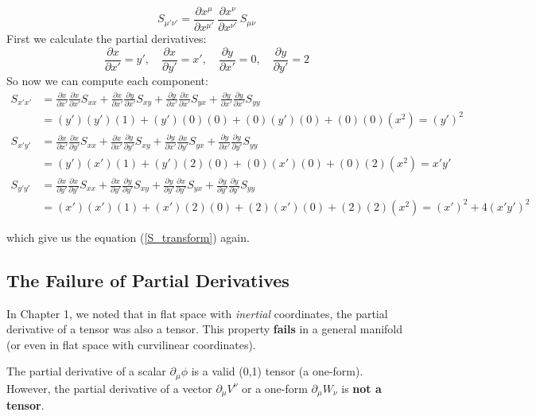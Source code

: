 \documentclass[11pt, a4paper]{report}
\begin{document}
\begin{equation}
    S_{\mu'\nu'} = \frac{\partial x^\mu}{\partial x^{\mu'}} \ \frac{\partial x^\nu}{\partial x^{\nu'}} \, S_{\mu \nu}
\end{equation}
First we calculate the partial derivatives:
$$\frac{\partial x}{\partial x'} = y', \quad \frac{\partial x}{\partial y'} = x', \quad \frac{\partial y}{\partial x'} = 0, \quad \frac{\partial y}{\partial y'} = 2$$
So now we can compute each component:
\begin{align*}
    S_{x'x'} &= \frac{\partial x}{\partial x'} \frac{\partial x}{\partial x'} S_{xx} + \frac{\partial x}{\partial x'} \frac{\partial y}{\partial x'} S_{xy} + \frac{\partial y}{\partial x'} \frac{\partial x}{\partial x'} S_{yx} + \frac{\partial y}{\partial x'} \frac{\partial y}{\partial x'} S_{yy} \\
    &= (y')(y')(1) + (y')(0)(0) + (0)(y')(0) + (0)(0)(x^2) = (y')^2 \\
    S_{x'y'} &= \frac{\partial x}{\partial x'} \frac{\partial x}{\partial y'} S_{xx} + \frac{\partial x}{\partial x'} \frac{\partial y}{\partial y'} S_{xy} + \frac{\partial y}{\partial x'} \frac{\partial x}{\partial y'} S_{yx} + \frac{\partial y}{\partial x'} \frac{\partial y}{\partial y'} S_{yy} \\
    &= (y')(x')(1) + (y')(2)(0) + (0)(x')(0) + (0)(2)(x^2) = x'y' \\
    S_{y'y'} &= \frac{\partial x}{\partial y'} \frac{\partial x}{\partial y'} S_{xx} + \frac{\partial x}{\partial y'} \frac{\partial y}{\partial y'} S_{xy} + \frac{\partial y}{\partial y'} \frac{\partial x}{\partial y'} S_{yx} + \frac{\partial y}{\partial y'} \frac{\partial y}{\partial y'} S_{yy} \\
    &= (x')(x')(1) + (x')(2)(0) + (2)(x')(0) + (2)(2)(x^2) = (x')^2 + 4(x'y')^2
\end{align*} 

which give us the equation (\ref{S_transform}) again.
\subsection*{The Failure of Partial Derivatives}
In Chapter 1, we noted that in flat space with \emph{inertial} coordinates, the partial derivative of a tensor was also a tensor. This property \textbf{fails} in a general manifold (or even in flat space with curvilinear coordinates).

The partial derivative of a scalar $\partial_\mu \phi$ is a valid (0,1) tensor (a one-form).
However, the partial derivative of a vector $\partial_\mu V^\nu$ or a one-form $\partial_\mu W_\nu$ is \textbf{not a tensor}.
\end{document}
